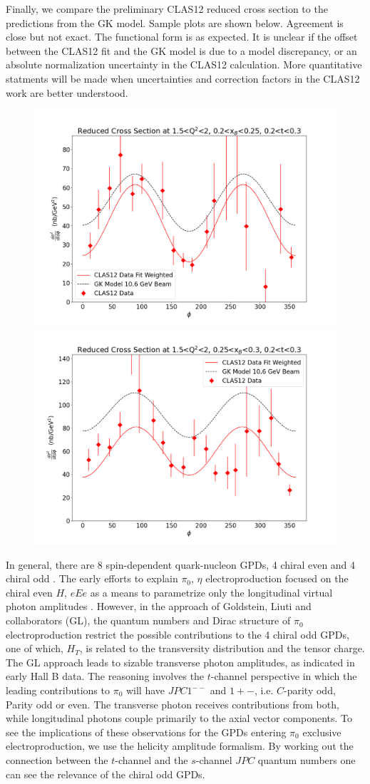 Finally, we compare the preliminary CLAS12 reduced cross section to the predictions from the GK model. Sample plots are shown below. Agreement is close but not exact. The functional form is as expected. It is unclear if the offset between the CLAS12 fit and the GK model is due to a model discrepancy, or an absolute normalization uncertainty in the CLAS12 calculation. More quantitative statments will be made when uncertainties and correction factors in the CLAS12 work are better understood.
\begin{figure}[hbt]
	\centering
	\includegraphics[page=6,width=0.45\linewidth]{Chapters/Ch5-Further/GK_model/pics/reduced_xsec_1.5_2_0.2_0.25_0.2_0.3.png}
	\includegraphics[page=6,width=0.45\linewidth]{Chapters/Ch5-Further/GK_model/pics/reduced_xsec_1.5_2_0.25_0.3_0.2_0.3.png}
\end{figure}\label{fig:oldres4}



\iffalse
In general, there are 8 spin-dependent quark-nucleon GPDs, 4 chiral even and 4 chiral odd \cite{8}. The early efforts to explain $\pi_0$, $\eta$ electroproduction focused on the chiral even $H$, $e Ee$ as a means to parametrize only the longitudinal virtual photon amplitudes \cite{7}. However, in the approach of Goldstein, Liuti and collaborators \cite{9} (GL), the quantum numbers and Dirac structure of $\pi_0$ electroproduction restrict the possible contributions to the 4 chiral odd GPDs, one of which, $H_T$, is related to the transversity distribution and the tensor charge. The GL approach leads to sizable transverse photon amplitudes, as indicated in early Hall B data. The reasoning involves the $t$-channel perspective in which the leading contributions to $\pi_0$ will have $J P C 1^{-−}$ and $1+−$, i.e. $C$-parity odd, Parity odd or even. The transverse photon receives contributions from both, while longitudinal photons couple primarily to the axial vector components. To see the implications of these observations for the GPDs entering $\pi_0$ exclusive electroproduction, we use the helicity amplitude formalism. By working out the connection between the $t$-channel and the $s$-channel $J P C$ quantum numbers one can see the relevance of the chiral odd GPDs.

